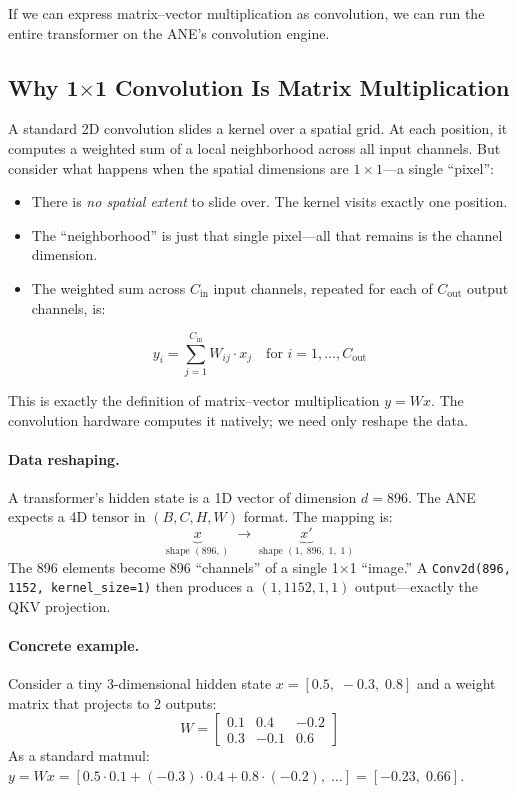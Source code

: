 \documentclass[11pt,twocolumn]{article}
\begin{document}
If we can express matrix--vector multiplication as convolution, we can
run the entire transformer on the ANE's convolution engine.

\subsection{Why 1$\times$1 Convolution Is Matrix Multiplication}

A standard 2D convolution slides a kernel over a spatial grid.  At
each position, it computes a weighted sum of a local neighborhood
across all input channels.  But consider what happens when the
spatial dimensions are $1 \times 1$---a single ``pixel'':

\begin{itemize}
\item There is \emph{no spatial extent} to slide over.  The kernel
  visits exactly one position.
\item The ``neighborhood'' is just that single pixel---all that
  remains is the channel dimension.
\item The weighted sum across $C_\text{in}$ input channels, repeated
  for each of $C_\text{out}$ output channels, is:
\end{itemize}

\begin{equation}
y_i = \sum_{j=1}^{C_\text{in}} W_{ij} \cdot x_j
\quad \text{for } i = 1, \ldots, C_\text{out}
\end{equation}

This is exactly the definition of matrix--vector multiplication
$y = Wx$.  The convolution hardware computes it natively; we need
only reshape the data.

\paragraph{Data reshaping.}
A transformer's hidden state is a 1D vector of dimension $d = 896$.
The ANE expects a 4D tensor in $(B, C, H, W)$ format.  The mapping is:
\[
  \underbrace{x}_{\text{shape } (896,)}
  \;\longrightarrow\;
  \underbrace{x'}_{\text{shape } (1,\; 896,\; 1,\; 1)}
\]
The 896 elements become 896 ``channels'' of a single 1$\times$1
``image.''  A \texttt{Conv2d(896, 1152, kernel\_size=1)} then
produces a $(1, 1152, 1, 1)$ output---exactly the QKV projection.

\paragraph{Concrete example.}
Consider a tiny 3-dimensional hidden state $x = [0.5,\; -0.3,\; 0.8]$
and a weight matrix that projects to 2 outputs:
\[
W = \begin{bmatrix} 0.1 & 0.4 & -0.2 \\ 0.3 & -0.1 & 0.6 \end{bmatrix}
\]
As a standard matmul: $y = Wx = [0.5 \cdot 0.1 + (-0.3) \cdot 0.4 + 0.8 \cdot (-0.2),\;\ldots] = [-0.23,\; 0.66]$.
\end{document}
